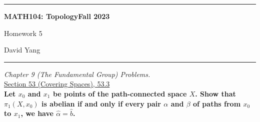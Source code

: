 \documentclass[11pt]{article}
\begin{document}
	\hrule
	\begin{center}
        \textbf{MATH104: Topology}\hfill \textbf{Fall 2023}\newline

		{\Large Homework 5}

		David Yang
	\end{center}

\hrule

\vspace{1em}

\textit{Chapter 9 (The Fundamental Group) Problems.} \\

\underline{Section 53 (Covering Spaces), 53.3} \\

\textbf{Let $x_0$ and $x_1$ be points of the path-connected space $X$. Show that $\pi_1(X, x_0)$ is abelian if and only if every pair
$\alpha$ and $\beta$ of paths from $x_0$ to $x_1$, we have $\hat{\alpha} = \hat{b}$.}
\end{document}

